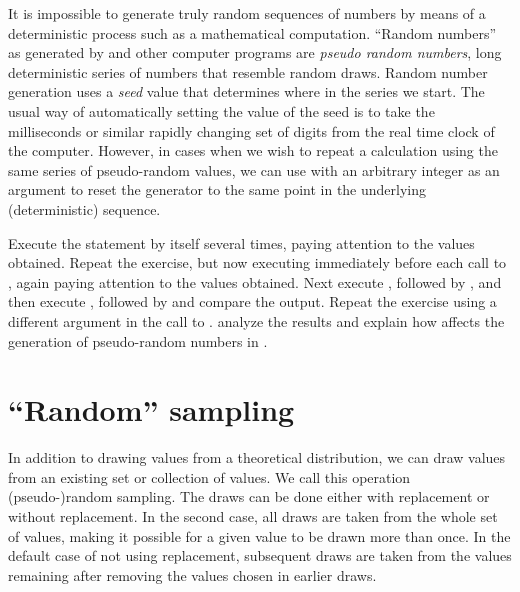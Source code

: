 \documentclass[krantz2]{krantz}\usepackage{knitr}
\begin{document}
\begin{explainbox}
It is impossible to generate truly random sequences of numbers by means of a deterministic process such as a mathematical computation. ``Random numbers'' as generated by \Rpgrm and other computer programs are \emph{pseudo random numbers}, long deterministic series of numbers that resemble random draws. Random number generation uses a \emph{seed} value that determines where in the series we start. The usual way of automatically setting the value of the seed is to take the milliseconds or similar rapidly changing set of digits from the real time clock of the computer. However, in cases when we wish to repeat a calculation using the same series of pseudo-random values, we can use  with an arbitrary integer as an argument to reset the generator to the same point in the underlying (deterministic) sequence.
\end{explainbox}

\begin{advplayground}
Execute the statement  by itself several times, paying attention to the values obtained. Repeat the exercise, but now executing  immediately before each call to , again paying attention to the values obtained. Next execute , followed by , and then execute , followed by  and compare the output. Repeat the exercise using a different argument in the call to . analyze the results and explain how  affects the generation of pseudo-random numbers in \Rlang.
\end{advplayground}

\section{``Random'' sampling}
%
%

In addition to drawing values from a theoretical distribution, we can draw values from an existing set or collection of values. We call this operation (pseudo-)random sampling. The draws can be done either with replacement or without replacement. In the second case, all draws are taken from the whole set of values, making it possible for a given value to be drawn more than once. In the default case of not using replacement, subsequent draws are taken from the values remaining after removing the values chosen in earlier draws.
\end{document}
